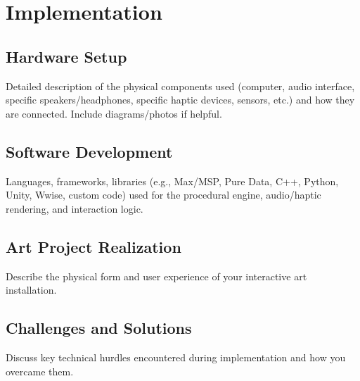 \chapter{Implementation}
    \section{Hardware Setup} Detailed description of the physical components used (computer, audio interface, specific speakers/headphones, specific haptic devices, sensors, etc.) and how they are connected. Include diagrams/photos if helpful.
    \section{Software Development} Languages, frameworks, libraries (e.g., Max/MSP, Pure Data, C++, Python, Unity, Wwise, custom code) used for the procedural engine, audio/haptic rendering, and interaction logic.
    \section{Art Project Realization} Describe the physical form and user experience of your interactive art installation.
    \section{Challenges and Solutions} Discuss key technical hurdles encountered during implementation and how you overcame them.